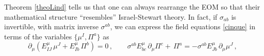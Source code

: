 \documentclass[aps,prl,singlecolumn,nofootinbib]{revtex4-2}
\theoremstyle{definition}
\theoremstyle{theorem}
\begin{document}
Theorem \ref{theoLind} tells us that one can always rearrange the EOM so that their mathematical structure ``resembles'' Israel-Stewart theory. In fact, if $\sigma_{ab}$ is invertible, with matrix inverse $\sigma^{ab}$, we can express the field equations \eqref{cinque} in terms of the variables $\{ \mu^I,\Pi^a \}$ as
\begin{equation}\label{lindblomrepr}    
    \partial_\mu (E^\mu_{IJ} \,  \mu^J + E^\mu_{Ib} \, \Pi^b)= 0 \, ,\qquad
       \sigma^{ab} E^\mu_{bc} \,\partial_\mu \Pi^c +  \,\Pi^a  = -  \sigma^{ab} E^\mu_{Jb} \,\partial_\mu \mu^J \, ,
\end{equation}
\end{document}
